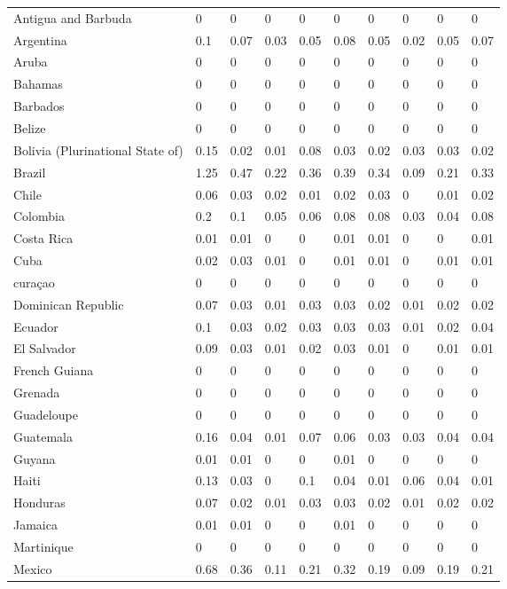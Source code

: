 \begin{longtable}[t]{llllllllll}
Antigua and Barbuda & 0 & 0 & 0 & 0 & 0 & 0 & 0 & 0 & 0\\
Argentina & 0.1 & 0.07 & 0.03 & 0.05 & 0.08 & 0.05 & 0.02 & 0.05 & 0.07\\
Aruba & 0 & 0 & 0 & 0 & 0 & 0 & 0 & 0 & 0\\
Bahamas & 0 & 0 & 0 & 0 & 0 & 0 & 0 & 0 & 0\\
Barbados & 0 & 0 & 0 & 0 & 0 & 0 & 0 & 0 & 0\\
Belize & 0 & 0 & 0 & 0 & 0 & 0 & 0 & 0 & 0\\
Bolivia (Plurinational State of) & 0.15 & 0.02 & 0.01 & 0.08 & 0.03 & 0.02 & 0.03 & 0.03 & 0.02\\
Brazil & 1.25 & 0.47 & 0.22 & 0.36 & 0.39 & 0.34 & 0.09 & 0.21 & 0.33\\
Chile & 0.06 & 0.03 & 0.02 & 0.01 & 0.02 & 0.03 & 0 & 0.01 & 0.02\\
Colombia & 0.2 & 0.1 & 0.05 & 0.06 & 0.08 & 0.08 & 0.03 & 0.04 & 0.08\\
Costa Rica & 0.01 & 0.01 & 0 & 0 & 0.01 & 0.01 & 0 & 0 & 0.01\\
Cuba & 0.02 & 0.03 & 0.01 & 0 & 0.01 & 0.01 & 0 & 0.01 & 0.01\\
curaçao & 0 & 0 & 0 & 0 & 0 & 0 & 0 & 0 & 0\\
Dominican Republic & 0.07 & 0.03 & 0.01 & 0.03 & 0.03 & 0.02 & 0.01 & 0.02 & 0.02\\
Ecuador & 0.1 & 0.03 & 0.02 & 0.03 & 0.03 & 0.03 & 0.01 & 0.02 & 0.04\\
El Salvador & 0.09 & 0.03 & 0.01 & 0.02 & 0.03 & 0.01 & 0 & 0.01 & 0.01\\
French Guiana & 0 & 0 & 0 & 0 & 0 & 0 & 0 & 0 & 0\\
Grenada & 0 & 0 & 0 & 0 & 0 & 0 & 0 & 0 & 0\\
Guadeloupe & 0 & 0 & 0 & 0 & 0 & 0 & 0 & 0 & 0\\
Guatemala & 0.16 & 0.04 & 0.01 & 0.07 & 0.06 & 0.03 & 0.03 & 0.04 & 0.04\\
Guyana & 0.01 & 0.01 & 0 & 0 & 0.01 & 0 & 0 & 0 & 0\\
Haiti & 0.13 & 0.03 & 0 & 0.1 & 0.04 & 0.01 & 0.06 & 0.04 & 0.01\\
Honduras & 0.07 & 0.02 & 0.01 & 0.03 & 0.03 & 0.02 & 0.01 & 0.02 & 0.02\\
Jamaica & 0.01 & 0.01 & 0 & 0 & 0.01 & 0 & 0 & 0 & 0\\
Martinique & 0 & 0 & 0 & 0 & 0 & 0 & 0 & 0 & 0\\
Mexico & 0.68 & 0.36 & 0.11 & 0.21 & 0.32 & 0.19 & 0.09 & 0.19 & 0.21\\

\end{longtable}
